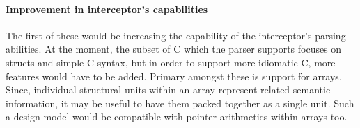 \paragraph{Improvement in interceptor's capabilities}
The first of these would be increasing the capability of the interceptor's parsing abilities. At the moment, the subset of C which the parser supports focuses on structs and simple C syntax, but in order to support more idiomatic C, more features would have to be added. Primary amongst these is support for arrays. Since, individual structural units within an array represent related semantic information, it may be useful to have them packed together as a single unit. Such a design model would be compatible with pointer arithmetics within arrays too.